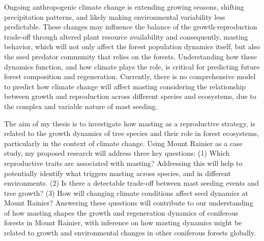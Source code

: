 \documentclass[11pt,letter]{article}
\begin{document}
Ongoing anthropogenic climate change is extending growing seasons, shifting precipitation patterns, and likely making environmental variability less predictable. These changes may influence the balance of the growth-reproduction trade-off through altered plant resource availability and consequently, masting behavior, which will not only affect the forest population dynamics itself, but also the seed predator community that relies on the forests. Understanding how these dynamics function, and how climate plays the role, is critical for predicting future forest composition and regeneration. Currently, there is no comprehensive model to predict how climate change will affect masting considering the relationship between growth and reproduction across different species and ecosystems, due to the complex and variable nature of mast seeding.\par
The aim of my thesis is to investigate how masting as a reproductive strategy, is related to the growth dynamics of tree species and their role in forest ecosystems, particularly in the context of climate change. Using Mount Rainier as a case study, my proposed research will address three key questions: (1) Which reproductive traits are associated with masting? Addressing this will help to potentially identify what triggers masting across species, and in different environments. (2) Is there a detectable trade-off between mast seeding events and tree growth? (3) How will changing climate conditions affect seed dynamics at Mount Rainier? Answering these questions will contribute to our understanding of how masting shapes the growth and regeneration dynamics of coniferous forests in Mount Rainier, with inference on how masting dynamics might be related to growth and environmental changes in other coniferous forests globally.\par
\end{document}
